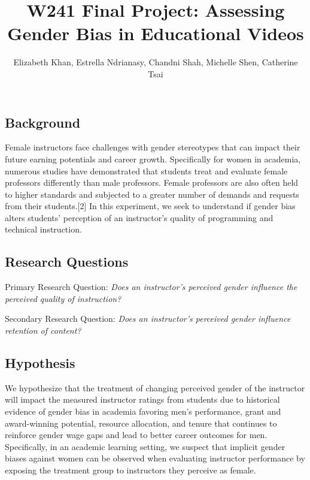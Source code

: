 \documentclass[
]{article}
\title{W241 Final Project: Assessing Gender Bias in Educational Videos}
\author{Elizabeth Khan, Estrella Ndrianasy, Chandni Shah, Michelle Shen,
Catherine Tsai}
\date{}
\begin{document}
\maketitle

{
\setcounter{tocdepth}{2}
\tableofcontents
}
\clearpage

\hypertarget{background}{%
\subsection{Background}\label{background}}

Female instructors face challenges with gender stereotypes that can
impact their future earning potentials and career growth. Specifically
for women in academia, numerous studies have demonstrated that students
treat and evaluate female professors differently than male professors.
Female professors are also often held to higher standards and subjected
to a greater number of demands and requests from their students.{[}2{]}
In this experiment, we seek to understand if gender bias alters
students' perception of an instructor's quality of programming and
technical instruction.

\hypertarget{research-questions}{%
\subsection{Research Questions}\label{research-questions}}

Primary Research Question: \emph{Does an instructor's perceived gender
influence the perceived quality of instruction?}

Secondary Research Question: \emph{Does an instructor's perceived gender
influence retention of content?}

\hypertarget{hypothesis}{%
\subsection{Hypothesis}\label{hypothesis}}

We hypothesize that the treatment of changing perceived gender of the
instructor will impact the measured instructor ratings from students due
to historical evidence of gender bias in academia favoring men's
performance, grant and award-winning potential, resource allocation, and
tenure that continues to reinforce gender wage gaps and lead to better
career outcomes for men. Specifically, in an academic learning setting,
we suspect that implicit gender biases against women can be observed
when evaluating instructor performance by exposing the treatment group
to instructors they perceive as female.
\end{document}
